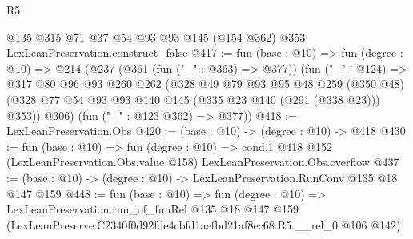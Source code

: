 \begin{lexlean}{R5}
\begin{coremodule}
    @135
    @315
    @71
    @37
    @54
    @93
    @93
    @145
    (@154 @362)
    @353
    LexLeanPreservation.construct_false
@417 := fun (base : @10) =>
  fun (degree : @10) =>
  @214
    (@237
      (@361 (fun ("_" : @363) => @377))
      (fun ("_" : @124) =>
      @317
        @80
        @96
        @93
        @260
        @262
        (@328
          @49
          @79
          @93
          @95
          @48
          @259
          (@350 @48)
          (@328 @77 @54 @93 @93 @140 @145 (@335 @23 @140 (@291 (@338 @23))) @353))
        @306)
      (fun ("_" : @123 @362) => @377))
@418 := LexLeanPreservation.Obs
@420 := (base : @10) -> (degree : @10) -> @418
@430 := fun (base : @10) =>
  fun (degree : @10) =>
  cond.{1} @418 @152 (LexLeanPreservation.Obs.value @158) LexLeanPreservation.Obs.overflow
@437 := (base : @10) -> (degree : @10) -> LexLeanPreservation.RunConv @135 @18 @147 @159
@448 := fun (base : @10) =>
  fun (degree : @10) =>
  LexLeanPreservation.run_of_funRel
    @135
    @18
    @147
    @159
    (LexLeanPreserve.C2340f0d92fde4cbfd1aefbd21af8ec68.R5.__rel_0 @106 @142)
\end{coremodule}
\end{lexlean}
